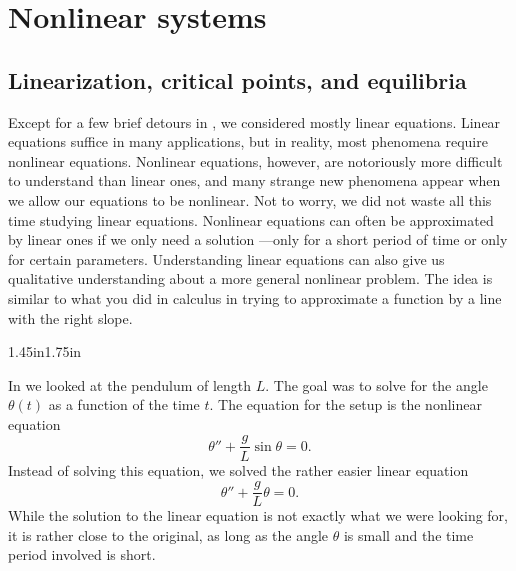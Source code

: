 \chapter{Nonlinear systems} \label{nlin:chapter}


\section{Linearization, critical points, and equilibria}
\label{linearization:section}




Except for a few brief detours in ,
we considered mostly linear
equations.  Linear equations suffice in many applications, but in reality,
most phenomena require nonlinear equations.  Nonlinear equations, however,
are notoriously more difficult to understand than linear ones, and 
many strange new phenomena appear when we allow our equations to be
nonlinear.
Not to worry, we did not waste all this time studying linear equations.
Nonlinear equations can often be approximated by linear ones if we only need
a solution ---only for a short period of time or
only for certain parameters.  Understanding linear equations can
also give us qualitative understanding about a more general nonlinear
problem.  The idea is similar to what you did in calculus in trying to
approximate a function by a line with the right slope.

\begin{mywrapfigsimp}{1.45in}{1.75in}
\noindent
{}
\end{mywrapfigsimp}
In  we looked at the pendulum of
length $L$.  The goal was to solve for the angle $\theta(t)$ as
a function of the time $t$.  The equation for the setup is
the nonlinear equation
\begin{equation*}
\theta'' + \frac{g}{L} \sin \theta = 0 .
\end{equation*}
Instead of solving this equation, we solved the rather easier linear
equation
\begin{equation*}
\theta'' + \frac{g}{L} \theta = 0 .
\end{equation*}
While the solution to the linear equation is not exactly what we were
looking for, it is rather close to the original, as long as the
angle $\theta$ is small and the time period involved is short.

